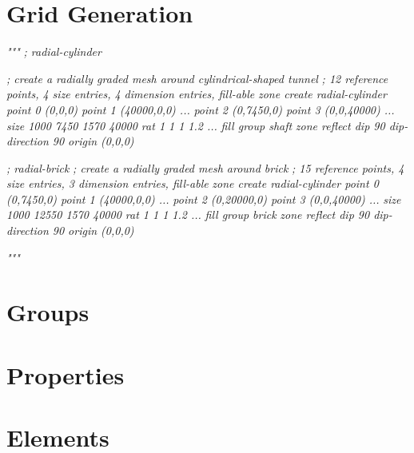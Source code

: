 \documentclass[a4paper, nobind]{templates/ociamthesis}
\newenvironment{Shaded}{\begin{snugshade}}{\end{snugshade}}
\newcommand{\CommentTok}[1]{\textcolor[rgb]{0.56,0.35,0.01}{\textit{#1}}}
\renewenvironment{Shaded}
{
  \vspace{10pt}%
  \begin{snugshade}%
}{%
  \end{snugshade}%
  \vspace{8pt}%
}
\begin{document}
\hypertarget{grid-generation}{%
\section{Grid Generation}\label{grid-generation}}

\begin{Shaded}
\begin{Highlighting}[]
\CommentTok{"""}
\CommentTok{; radial{-}cylinder}

\CommentTok{; create a radially graded mesh around cylindrical{-}shaped tunnel}
\CommentTok{; 12 reference points, 4 size entries, 4 dimension entries, fill{-}able}
\CommentTok{zone create radial{-}cylinder point 0 (0,0,0)  point 1 (40000,0,0) ...}
\CommentTok{                            point 2 (0,7450,0) point 3 (0,0,40000) ...}
\CommentTok{                            size 1000 7450 1570 40000 rat 1 1 1 1.2 ...}
\CommentTok{                            fill group \textquotesingle{}shaft\textquotesingle{}}
\CommentTok{zone reflect dip 90 dip{-}direction 90 origin (0,0,0)}

\CommentTok{; radial{-}brick}
\CommentTok{; create a radially graded mesh around brick}
\CommentTok{; 15 reference points, 4 size entries, 3 dimension entries, fill{-}able}
\CommentTok{zone create radial{-}cylinder point 0 (0,7450,0)  point 1 (40000,0,0) ...}
\CommentTok{                            point 2 (0,20000,0) point 3 (0,0,40000) ...}
\CommentTok{                            size 1000 12550 1570 40000 rat 1 1 1 1.2 ...}
\CommentTok{                            fill group \textquotesingle{}brick\textquotesingle{}}
\CommentTok{zone reflect dip 90 dip{-}direction 90 origin (0,0,0)}

\CommentTok{"""}
\end{Highlighting}
\end{Shaded}

\hypertarget{groups}{%
\section{Groups}\label{groups}}

\hypertarget{properties}{%
\section{Properties}\label{properties}}

\hypertarget{elements}{%
\section{Elements}\label{elements}}
\end{document}
